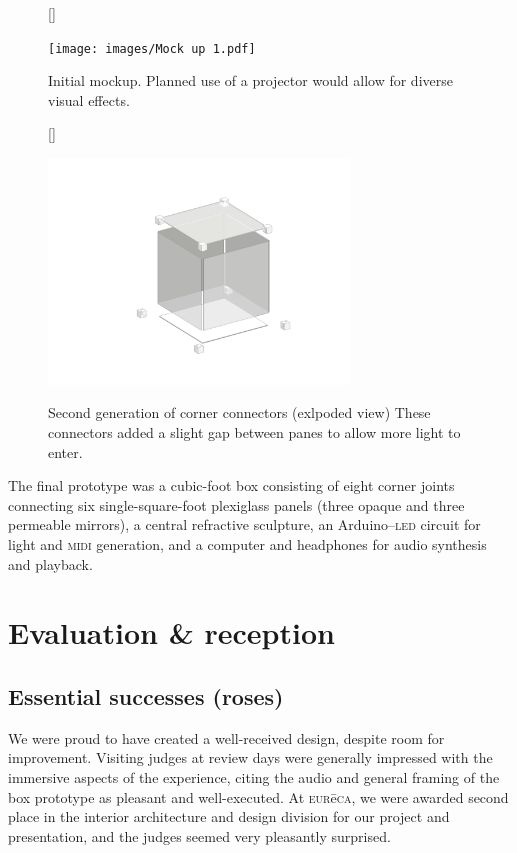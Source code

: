 \documentclass[12pt]{article}
\begin{document}
    
    \begin{figure}[h]
        [\FBwidth]
        {\caption{Initial mockup. Planned use of a projector would allow for diverse visual effects.}\label{fig:mockup}}
        {\texttt{[image: images/Mock up 1.pdf]}}
    \end{figure}
    \begin{figure}[h]
        [\FBwidth]
        {\caption{Second generation of corner connectors (exlpoded view) These connectors added a slight gap between panes to allow more light to enter.}\label{fig:exploded}}
        {\includegraphics[width=8cm]{images/exploded.png}}
    \end{figure}

    The final prototype was a cubic-foot box consisting of eight corner joints connecting six single-square-foot plexiglass panels (three opaque and three permeable mirrors), a central refractive sculpture, an Arduino–\textsc{led} circuit for light and \textsc{midi} generation, and a computer and headphones for audio synthesis and playback.
    

    
    \pagebreak
    \section{Evaluation \textsc{\&} reception}

    \subsection{Essential successes (roses)}

    We were proud to have created a well-received design, despite
    room for improvement. Visiting judges at review days were generally impressed with the immersive aspects of the experience, citing the audio and general framing of the box prototype as pleasant and well-executed. At \textsc{eur}ē\textsc{ca}, we were awarded second place in the interior architecture and design division for our project and presentation, and the judges seemed very pleasantly surprised.
\end{document}
